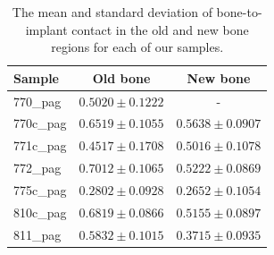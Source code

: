 \begin{table}
    \caption{The mean and standard deviation of bone-to-implant contact in the old and new bone regions for each of our samples.}
    \label{tab:bic}
    \centering
    \begin{tabular}{lcc}
        \toprule
        Sample & Old bone & New bone \\
        \midrule
        770\_pag & $0.5020 \pm 0.1222$ & - \\
        770c\_pag & $0.6519 \pm 0.1055$ & $0.5638 \pm 0.0907$ \\
        771c\_pag & $0.4517 \pm 0.1708$ & $0.5016 \pm 0.1078$ \\
        772\_pag & $0.7012 \pm 0.1065$ & $0.5222 \pm 0.0869$ \\
        775c\_pag & $0.2802 \pm 0.0928$ & $0.2652 \pm 0.1054$ \\
        810c\_pag & $0.6819 \pm 0.0866$ & $0.5155 \pm 0.0897$ \\
        811\_pag & $0.5832 \pm 0.1015$ & $0.3715 \pm 0.0935$ \\
        \bottomrule
    \end{tabular}
\end{table}

